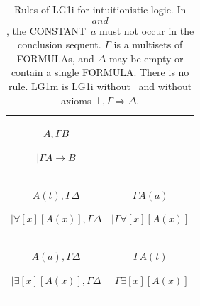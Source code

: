 \documentclass[10pt,a4paper]{article}
\newcommand*{\olup}[1]{\MakeUppercase{#1}}
\theoremstyle{plain}
\theoremstyle{definition}
\theoremstyle{remark}
\newcommand*{\ollabel}[1]{\label{#1}}
\providecommand{\RightLabel}[1]{}
\providecommand{\DisplayProof}{}
\providecommand{\fCenter}{}
\providecommand{\lif}{\mathbin{\rightarrow}}
\providecommand{\lforall}{\mathord{\forall}}
\providecommand{\lexists}{\mathord{\exists}}
\providecommand{\lfalse}{\bot}
\providecommand{\Sequent}{\mathrel{\Rightarrow}}
\providecommand{\Log}{\ensuremath{\mathrm{L}}}
\providecommand{\LeftR}[1]{}
\providecommand{\RightR}[1]{}
\providecommand{\UnaryInf}{\ensuremath{\mid}}
\providecommand{\Weakening}{\mathrm{Wk}}
\providecommand{\RightR}{\mathrm{R}}
\providecommand{\LeftR}{\mathrm{L}}
\providecommand{\Axiom}{\mathrm{Ax}}
\providecommand{\Contraction}{\mathrm{C}}
\begin{document}
\begin{table}
\begin{tabular}{@{}c@{}c@{}}
\Axiom$ A, \Gamma \fCenter B$
\RightLabel{\RightR{\lif}}
\UnaryInf$ \Gamma \fCenter A \lif B $
\DisplayProof
\\[4ex]
\Axiom$ A(t), \Gamma \fCenter \Delta$
\RightLabel{\LeftR{\lforall}}
\UnaryInf$ \lforall[x][A(x)],\Gamma \fCenter \Delta$
\DisplayProof
&
\Axiom$ \Gamma \fCenter A(a) $
\RightLabel{\RightR{\lforall}}
\UnaryInf$ \Gamma \fCenter \lforall[x][A(x)]$
\DisplayProof
\\[4ex]
\Axiom$ A(a), \Gamma \fCenter \Delta $
\RightLabel{\LeftR{\lexists}}
\UnaryInf$ \lexists[x][A(x)], \Gamma \fCenter \Delta$
\DisplayProof
&
\Axiom$ \Gamma \fCenter A(t) $
\RightLabel{\RightR{\lexists}}
\UnaryInf$ \Gamma \fCenter \lexists[x][A(x)]$
\DisplayProof
\end{tabular}
\caption{Rules of \Log{G1i} for intuitionistic logic. In
$\RightR{\forall}$ and $\LeftR{\exists}$, the \olup{constant}~$a$ must
not occur in the conclusion sequent. $\Gamma$ is a multisets of
\olup{formula}s, and $\Delta$ may be empty or contain a single
\olup{formula}. There is no \RightR{\Contraction} rule. \Log{G1m} is
\Log{G1i} without~\RightR{\Weakening} and without axioms $\lfalse,
\Gamma \Sequent \Delta$.}
\ollabel{tab:G1i}
\end{table}

\end{document}

